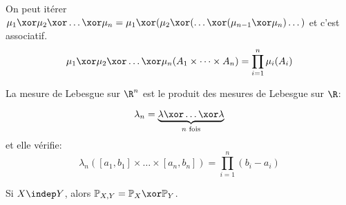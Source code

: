 \begin{remarque}
	On peut itérer $\mu_1 \xor \mu_2 \xor \dots \xor \mu_n = \mu_1 \xor (\mu_2 \xor (\dots \xor (\mu_{n-1} \xor \mu_n)\dots)$ et c'est associatif.
	$$ \mu_1 \xor \mu_2 \xor \dots \xor \mu_n(A_1 \times \dots \times A_n) = \prod_{i=1}^n \mu_i(A_i) $$
\end{remarque}


\begin{example}
	La mesure de Lebesgue sur $\R^n$ est le produit des mesures de Lebesgue sur $\R$:

	$$\lambda_n = \underbrace{\lambda \xor \dots \xor \lambda}_{n \text{ fois}}$$
	et elle vérifie:
	$$\lambda_n([a_1, b_1] \times \dots \times [a_n, b_n]) = \prod_{i=1}^n (b_i - a_i)$$
\end{example}

\begin{remarque}
	Si $X \indep Y$, alors $\mathbb{P}_{X,Y} = \mathbb{P}_X \xor \mathbb{P}_Y$.
\end{remarque}
